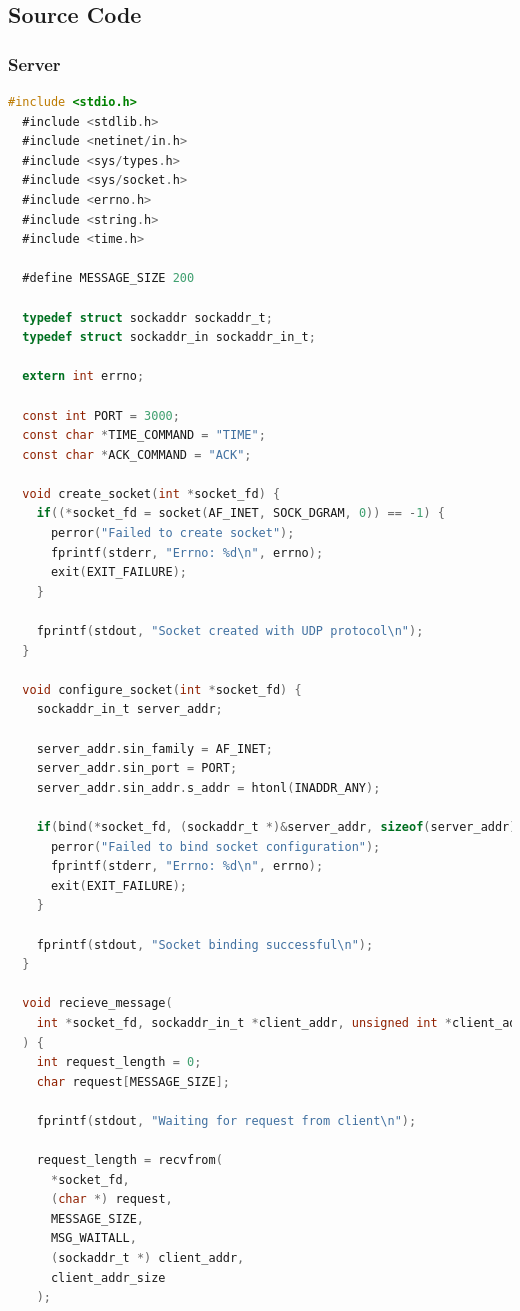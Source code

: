 \subsection{Source Code}
\subsubsection{Server}
\begin{lstlisting}[language=C]
  #include <stdio.h>
  #include <stdlib.h>
  #include <netinet/in.h>
  #include <sys/types.h>
  #include <sys/socket.h>
  #include <errno.h>
  #include <string.h>
  #include <time.h>
  
  #define MESSAGE_SIZE 200
  
  typedef struct sockaddr sockaddr_t;
  typedef struct sockaddr_in sockaddr_in_t;
  
  extern int errno;
  
  const int PORT = 3000;
  const char *TIME_COMMAND = "TIME";
  const char *ACK_COMMAND = "ACK";
  
  void create_socket(int *socket_fd) {
    if((*socket_fd = socket(AF_INET, SOCK_DGRAM, 0)) == -1) {
      perror("Failed to create socket");
      fprintf(stderr, "Errno: %d\n", errno);
      exit(EXIT_FAILURE);
    }
  
    fprintf(stdout, "Socket created with UDP protocol\n");
  }
  
  void configure_socket(int *socket_fd) {
    sockaddr_in_t server_addr;
  
    server_addr.sin_family = AF_INET;
    server_addr.sin_port = PORT;
    server_addr.sin_addr.s_addr = htonl(INADDR_ANY);
  
    if(bind(*socket_fd, (sockaddr_t *)&server_addr, sizeof(server_addr)) == -1) {
      perror("Failed to bind socket configuration");
      fprintf(stderr, "Errno: %d\n", errno);
      exit(EXIT_FAILURE);
    }
  
    fprintf(stdout, "Socket binding successful\n");
  }
  
  void recieve_message(
    int *socket_fd, sockaddr_in_t *client_addr, unsigned int *client_addr_size
  ) {
    int request_length = 0;
    char request[MESSAGE_SIZE];
  
    fprintf(stdout, "Waiting for request from client\n");
  
    request_length = recvfrom(
      *socket_fd,
      (char *) request,
      MESSAGE_SIZE,
      MSG_WAITALL,
      (sockaddr_t *) client_addr,
      client_addr_size
    );
  

\end{lstlisting}
